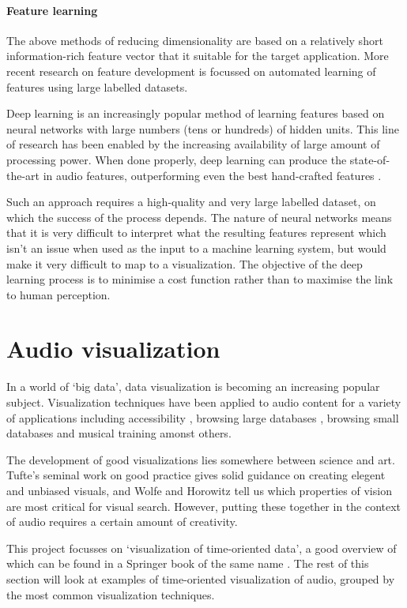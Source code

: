 \paragraph{Feature learning}
The above methods of reducing dimensionality are based on a relatively short
information-rich feature vector that it suitable for the target application.
More recent research on feature development is focussed on automated learning
of features using large labelled datasets.

Deep learning is an increasingly popular method of learning features based on
neural networks with large numbers (tens or hundreds) of hidden units. This
line of research has been enabled by the increasing availability of large
amount of processing power. When done properly, deep learning can produce the
state-of-the-art in audio features, outperforming even the best hand-crafted
features \citep{Hamel2010,Sigtia2014}.

Such an approach requires a high-quality and very large labelled dataset, on
which the success of the process depends. The nature of neural networks means
that it is very difficult to interpret what the resulting features represent
which isn't an issue when used as the input to a machine learning system, but
would make it very difficult to map to a visualization. The objective of the
deep learning process is to minimise a cost function rather than to maximise
the link to human perception.

\section{Audio visualization}
In a world of `big data', data visualization is becoming an increasing popular
subject. Visualization techniques have been applied to audio content for a
variety of applications including accessibility \citep{Ho-Ching2003}, browsing
large databases \citep{FontCorbera2010}, browsing small databases \citep{Yoo2011}
and musical training \citep{Ferguson2005} amonst others.

The development of good visualizations lies somewhere between science and art.
Tufte's seminal work on good practice \citep{Tufte2001} gives solid guidance on
creating elegent and unbiased visuals, and Wolfe and Horowitz \citep{Wolfe2004}
tell us which properties of vision are most critical for visual search.
However, putting these together in the context of audio requires a certain
amount of creativity.

This project focusses on `visualization of time-oriented data', a good overview
of which can be found in a Springer book of the same name \citep{Aigner2011}.
The rest of this section will look at examples of time-oriented visualization
of audio, grouped by the most common visualization techniques.


